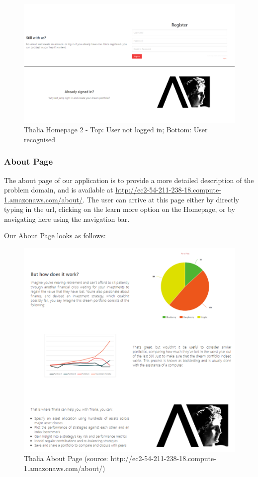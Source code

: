 \documentclass[main.tex]{subfiles}
\begin{document}
\begin{figure}[H]
   \centering
   \includegraphics[width=\textwidth]{10Appendices/081User/081Pictures/homepage_bottom.png}
   \caption{Thalia Homepage 2 - Top: User not logged in; Bottom: User recognised}
   \label{thalia_home_bottom}
\end{figure}

\subsubsection{About Page}

The about page of our application is to provide a more detailed description of the problem domain, and is available at \url{http://ec2-54-211-238-18.compute-1.amazonaws.com/about/}.
The user can arrive at this page either by directly typing in the url, clicking on the learn more option on the Homepage, or by navigating here using the navigation bar.

Our About Page looks as follows:

\begin{figure}[H]
   \centering
   \includegraphics[width=\textwidth]{10Appendices/081User/081Pictures/about.png}
   \caption{Thalia About Page (source: http://ec2-54-211-238-18.compute-1.amazonaws.com/about/)}
   \label{thalia_about}
\end{figure}
\end{document}
